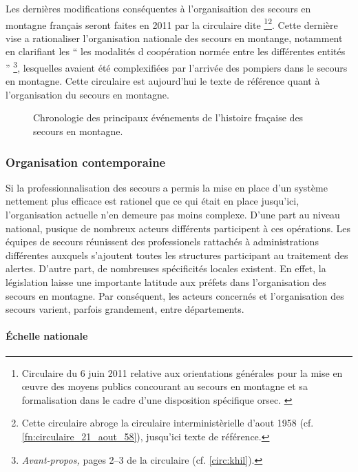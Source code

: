 Les dernières modifications conséquentes à l'organisaition des secours
en montagne français seront faites en 2011 par la circulaire dite
 \footnote{Circulaire du 6 juin 2011 relative aux
  orientations générales pour la mise en œuvre des moyens publics
  concourant au secours en montagne et sa formalisation dans le cadre
  d’une disposition spécifique
  \ac{orsec}. \label{circ:khil}}\multiplefootnoteseparator\footnote{Cette
  circulaire abroge la circulaire interministèrielle d'aout 1958
  (cf. \autoref{fn:circulaire_21_aout_58}), jusqu'ici texte de
  référence.}. Cette dernière vise a rationaliser l'organisation
nationale des secours en montange, notamment en clarifiant les
\enquote{\textelp{} les modalités d coopération normée
  entre les différentes entités \textelp{}}
\footnote{\emph{Avant-propos,} pages 2--3 de la circulaire 
  (cf. \autoref{circ:khil}).}, lesquelles avaient été complexifiées
par l'arrivée des pompiers dans le secours en montagne. Cette
circulaire est aujourd'hui le texte de référence quant à
l'organisation du secours en montagne.

\begin{figure}
  \centering
   
   \caption{Chronologie des principaux événements de
     l'histoire fraçaise des secours en montagne.}
  \label{fig:frise_chronologique}
\end{figure}

\subsubsection{Organisation contemporaine}
\label{subsubsec:1-1-1-2}

Si la professionnalisation des secours a permis la mise en place d'un
système nettement plus efficace est rationel que ce qui était en place
jusqu'ici, l'organisation actuelle n'en demeure pas moins
complexe. D'une part au niveau national, pusique de nombreux acteurs
différents participent à ces opérations. Les équipes de secours
réunissent des professionels rattachés à administrations différentes
auxquels s’ajoutent toutes les structures participant au traitement
des alertes. D'autre part, de nombreuses spécificités locales
existent. En effet, la législation laisse une importante latitude aux
préfets dans l'organisation des secours en montagne. Par conséquent,
les acteurs concernés et l'organisation des secours varient, parfois
grandement, entre départements.

\paragraph{Échelle nationale}


